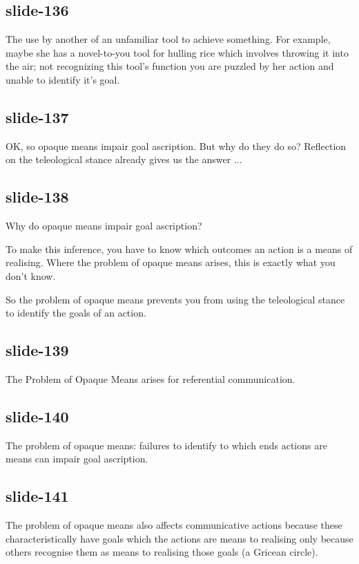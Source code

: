 \documentclass[12pt,\papersize]{extarticle}
\begin{document}
\subsection{slide-136}
The use by another of an unfamiliar tool to achieve something.
For example, maybe she has a novel-to-you tool for hulling rice
which involves throwing it into the air;
not recognizing this tool’s function you are puzzled by her action
and unable to identify it’s goal.

\subsection{slide-137}
OK, so opaque means impair goal ascription.
But why do they do so?
Reflection on the teleological stance already gives us the answer ...

\subsection{slide-138}
Why do opaque means impair goal ascription?
\citep[p.~255]{Csibra:1998cx}

To make this inference, you have to know which outcomes an
action is a means of realising.
Where the problem of opaque means arises, this is exactly what
you don’t know.

So the problem of opaque means prevents you from using the teleological
stance to identify the goals of an action.

\subsection{slide-139}
The Problem of Opaque Means arises for referential communication.

\subsection{slide-140}
The problem of opaque means:
failures to identify to which ends actions are means can impair goal ascription.

\subsection{slide-141}
The problem of opaque means also affects communicative actions
because these characteristically have  goals which the actions
are means to realising only because others recognise them as
means to realising those goals (a Gricean circle).
\end{document}
